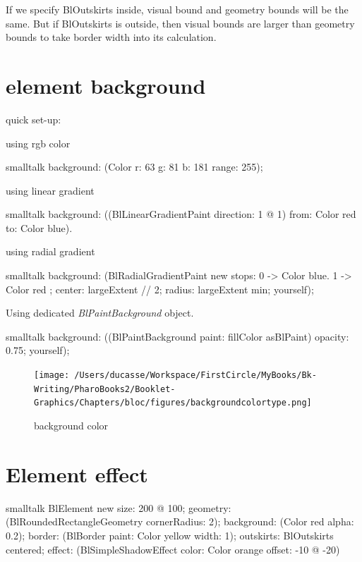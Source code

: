 \documentclass[10pt,twoside,english]{_support/latex/sbabook/sbabook}
\begin{document}
If we specify BlOutskirts inside, visual bound and geometry bounds will be the
same. But if BlOutskirts is outside, then visual bounds are larger than
geometry bounds to take border width into its calculation.

\section{element background}
quick set-up: 

using rgb color
\begin{displaycode}{smalltalk}
background: (Color r: 63 g: 81           b: 181     range: 255);
\end{displaycode}

using linear gradient
\begin{displaycode}{smalltalk}
background: ((BlLinearGradientPaint direction: 1 @ 1) from: Color red to: Color blue).
\end{displaycode}

using radial gradient
\begin{displaycode}{smalltalk}
background: (BlRadialGradientPaint new
stops: { 0 -> Color blue. 1 -> Color red };
center: largeExtent // 2;
radius: largeExtent min;
yourself);
\end{displaycode}

Using dedicated \textit{BlPaintBackground} object.
\begin{displaycode}{smalltalk}
background: ((BlPaintBackground paint: fillColor asBlPaint) opacity: 0.75; yourself);
\end{displaycode}

\begin{figure}[htpb]
\begin{center}
\texttt{[image: /Users/ducasse/Workspace/FirstCircle/MyBooks/Bk-Writing/PharoBooks2/Booklet-Graphics/Chapters/bloc/figures/backgroundcolortype.png]}
\caption{background color}
\end{center}
\end{figure}


\section{Element effect}
\begin{displaycode}{smalltalk}
BlElement new
        size: 200 @ 100;
        geometry: (BlRoundedRectangleGeometry cornerRadius: 2);
        background: (Color red alpha: 0.2);
        border: (BlBorder paint: Color yellow width: 1);
        outskirts: BlOutskirts centered;
        effect:
            (BlSimpleShadowEffect color: Color orange offset: -10 @ -20)
\end{displaycode}
\end{document}
